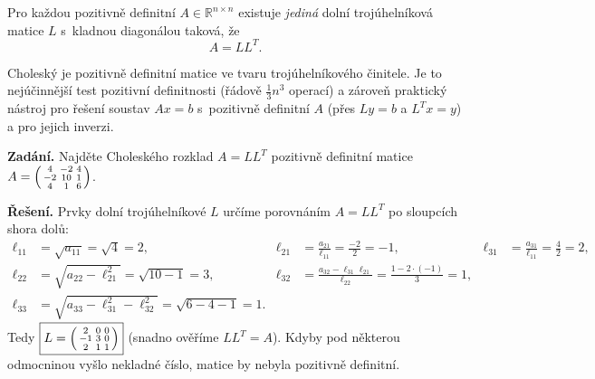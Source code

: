 \documentclass[11pt,a4paper]{article}
\begin{document}
\begin{veta}
Pro každou pozitivně definitní $A\in\mathbb{R}^{n\times n}$ existuje \emph{jediná} dolní trojúhelníková matice $L$ s~kladnou diagonálou taková, že
\[
  A=LL^T.
\]
\end{veta}

\begin{intuice}
Choleský je  pozitivně definitní matice ve tvaru trojúhelníkového činitele. Je to nejúčinnější test pozitivní definitnosti (řádově $\tfrac13n^3$ operací) a zároveň praktický nástroj pro řešení soustav $Ax=b$ s~pozitivně definitní $A$ (přes $Ly=b$ a $L^Tx=y$) a pro jejich inverzi.
\end{intuice}

\begin{priklad}
\textbf{Zadání.} Najděte Choleského rozklad $A=LL^T$ pozitivně definitní matice $A=\begin{psmallmatrix}4&-2&4\\-2&10&1\\4&1&6\end{psmallmatrix}$.\par
\textbf{Řešení.} Prvky dolní trojúhelníkové $L$ určíme porovnáním $A=LL^T$ po sloupcích shora dolů:
\[
\begin{aligned}
  \ell_{11}&=\sqrt{a_{11}}=\sqrt4=2, & \ell_{21}&=\tfrac{a_{21}}{\ell_{11}}=\tfrac{-2}{2}=-1, & \ell_{31}&=\tfrac{a_{31}}{\ell_{11}}=\tfrac{4}{2}=2,\\
  \ell_{22}&=\sqrt{a_{22}-\ell_{21}^2}=\sqrt{10-1}=3, & \ell_{32}&=\tfrac{a_{32}-\ell_{31}\ell_{21}}{\ell_{22}}=\tfrac{1-2\cdot(-1)}{3}=1, &&\\
  \ell_{33}&=\sqrt{a_{33}-\ell_{31}^2-\ell_{32}^2}=\sqrt{6-4-1}=1. &&&&
\end{aligned}
\]
Tedy $\boxed{L=\begin{psmallmatrix}2&0&0\\-1&3&0\\2&1&1\end{psmallmatrix}}$ (snadno ověříme $LL^T=A$). Kdyby pod některou odmocninou vyšlo nekladné číslo, matice by nebyla pozitivně definitní.
\end{priklad}
\end{document}

